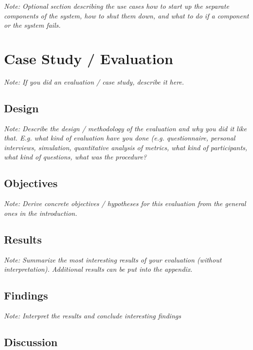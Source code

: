 \documentclass[a4paper,12pt,twoside]{report}
\begin{document}
\textit{Note: Optional section describing the use cases how to start up the separate components of the system, how to shut them down, and what to do if a component or the system fails.}






\chapter{Case Study / Evaluation}

\textit{Note: If you did an evaluation / case study, describe it here.}

\section{Design}

\textit{Note: Describe the design / methodology of the evaluation and why you did it like that. E.g. what kind of evaluation have you done (e.g. questionnaire, personal interviews, simulation, quantitative analysis of metrics, what kind of participants, what kind of questions, what was the procedure?}

\section{Objectives}

\textit{Note: Derive concrete objectives / hypotheses for this evaluation from the general ones in the introduction.}

\section{Results}

\textit{Note: Summarize the most interesting results of your evaluation (without interpretation). Additional results can be put into the appendix.}

\section{Findings}

\textit{Note: Interpret the results and conclude interesting findings}

\section{Discussion}
\end{document}

